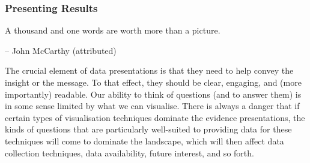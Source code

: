 \subsubsection{Presenting Results}
\begin{tcolorbox}[title=... and the Yang]
A thousand and one words are worth more than a picture.\\[-0.6cm]
\begin{flushright}
-- John McCarthy (attributed)
\end{flushright}
\end{tcolorbox}\noindent
The crucial element of data presentations is that they need to help convey the insight or the message. To that effect, they should be clear, engaging, and (more importantly) readable. Our ability to think of questions (and to answer them) is in some sense limited by what we can visualise. There is always a danger that if certain types of visualisation techniques dominate the evidence presentations, the kinds of questions that are particularly well-suited to providing data for these techniques will come to dominate the landscape, which will then affect data collection techniques, data availability, future interest, and so forth.
